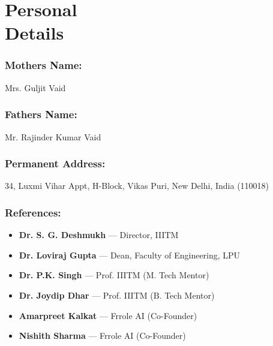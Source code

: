 \documentclass{article}
\begin{document}
\iftwopage

\else

\section{Personal \\ Details}
	\subsubsection {\textbf{Mothers Name:}} Mrs. Guljit Vaid
	\subsubsection {\textbf{Fathers Name:}}	Mr. Rajinder Kumar Vaid
	\subsubsection{\textbf{Permanent Address:}} 34, Luxmi Vihar Appt, H-Block, Vikas Puri, New Delhi, India (110018)
	\subsubsection {\textbf{References:}}
		\begin{itemize}
			\vspace{1ex}
			\item \textbf{Dr. S. G. Deshmukh} --- Director, IIITM
			\item \textbf{Dr. Loviraj Gupta} --- Dean, Faculty of Engineering, LPU
			\item \textbf{Dr. P.K. Singh} --- Prof. IIITM (M. Tech Mentor)
			\item \textbf{Dr. Joydip Dhar} --- Prof. IIITM (B. Tech Mentor)
			\item \textbf{Amarpreet Kalkat} --- Frrole AI (Co-Founder)
			\item \textbf{Nishith Sharma} --- Frrole AI (Co-Founder)
		\end{itemize}
\fi
	
\end{document}
